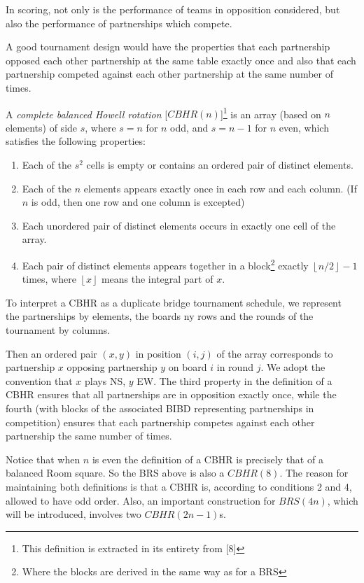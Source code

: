 \documentclass[
  11pt,
  a4paper]{book}
\begin{document}
In scoring, not only is the performance of teams in
opposition considered, but also the performance of
partnerships which compete.

A good tournament design would have the properties that each
partnership opposed each other partnership at the same table
exactly once and also that each partnership competed against
each other partnership at the same number of times.

A \emph{complete balanced Howell rotation} {[}\(CBHR(n)\){]}\footnote{This definition is extracted in its entirety from {[}8{]}} is an
array (based on \(n\) elements) of side \(s\), where \(s = n\) for
\(n\) odd, and \(s = n-1\) for \(n\) even, which satisfies the
following properties:

\begin{enumerate}
\def\labelenumi{\arabic{enumi}.}
\item
  Each of the \(s^2\) cells is empty or contains an ordered
  pair of distinct elements.
\item
  Each of the \(n\) elements appears exactly once in each
  row and each column. (If \(n\) is odd, then one row and
  one column is excepted)
\item
  Each unordered pair of distinct elements occurs in
  exactly one cell of the array.
\item
  Each pair of distinct elements appears together in a
  block\footnote{Where the blocks are derived in the same way as for a BRS} exactly \(\left \lfloor{n/2}\right \rfloor -1\)
  times, where \(\left \lfloor{x}\right \rfloor\) means the
  integral part of \(x\).
\end{enumerate}

To interpret a CBHR as a duplicate bridge tournament
schedule, we represent the partnerships by elements, the
boards ny rows and the rounds of the tournament by columns.

Then an ordered pair \((x, y)\) in position \((i, j)\) of the
array corresponds to partnership \(x\) opposing partnership
\(y\) on board \(i\) in round \(j\). We adopt the convention that
\(x\) plays NS, \(y\) EW. The third property in the definition
of a CBHR ensures that all partnerships are in opposition
exactly once, while the fourth (with blocks of the
associated BIBD representing partnerships in competition)
ensures that each partnership competes against each other
partnership the same number of times.

Notice that when \(n\) is even the definition of a CBHR is
precisely that of a balanced Room square. So the BRS above
is also a \(CBHR(8)\). The reason for maintaining both
definitions is that a CBHR is, according to conditions 2 and
4, allowed to have odd order. Also, an important
construction for \(BRS(4n)\), which will be introduced,
involves two \(CBHR(2n - 1)\)s.
\end{document}
